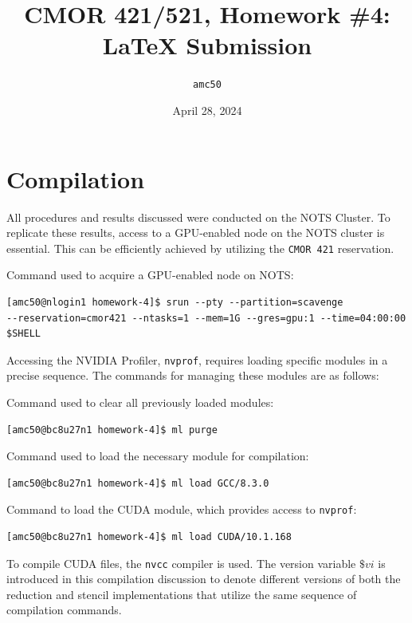 \documentclass{article}
\title{CMOR 421/521, Homework \#4: \LaTeX{} Submission}
\author{\texttt{amc50}}
\date{April 28, 2024}
\begin{document}
\maketitle

\section{Compilation}

All procedures and results discussed were conducted on the NOTS Cluster. To replicate these results, access to a GPU-enabled node on the NOTS cluster is essential. This can be efficiently achieved by utilizing the \texttt{CMOR 421} reservation.

\bigskip
\noindent
Command used to acquire a GPU-enabled node on NOTS:

\begin{verbatim}
[amc50@nlogin1 homework-4]$ srun --pty --partition=scavenge
--reservation=cmor421 --ntasks=1 --mem=1G --gres=gpu:1 --time=04:00:00 $SHELL
\end{verbatim}

\bigskip
\noindent
Accessing the NVIDIA Profiler, \texttt{nvprof}, requires loading specific modules in a precise sequence. The commands for managing these modules are as follows:

\bigskip
\noindent
Command used to clear all previously loaded modules:

\begin{verbatim}
[amc50@bc8u27n1 homework-4]$ ml purge
\end{verbatim}

\bigskip
\noindent
Command used to load the necessary module for compilation:

\begin{verbatim}
[amc50@bc8u27n1 homework-4]$ ml load GCC/8.3.0
\end{verbatim}

\bigskip
\noindent
Command to load the CUDA module, which provides access to \texttt{nvprof}:

\begin{verbatim}
[amc50@bc8u27n1 homework-4]$ ml load CUDA/10.1.168 
\end{verbatim}

\bigskip
\noindent
To compile CUDA files, the \texttt{nvcc} compiler is used. The version variable \(\$vi\) is introduced in this compilation discussion to denote different versions of both the reduction and stencil implementations that utilize the same sequence of compilation commands.
\end{document}
